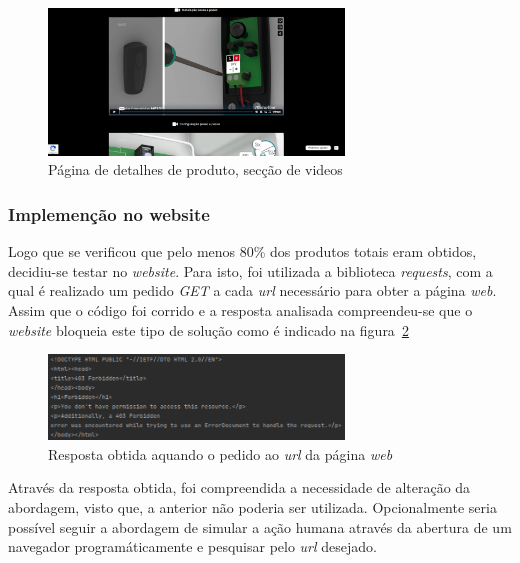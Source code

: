 \begin{figure}[htb]
    \centering
    
    \includegraphics[width=0.7\textwidth]{images/implementacao/scraper/pagina_detalhes_videos.png}
    \caption{Página de detalhes de produto, secção de videos}
    \label{fig:55}
\end{figure}

\newpage

\subsubsection{Implemenção no website}

Logo que se verificou que pelo menos 80\% dos produtos totais eram obtidos, decidiu-se testar no \textit{website}. Para isto, foi utilizada a biblioteca \textit{requests}, com a qual é realizado um pedido \textit{GET} a cada \textit{url} necessário para obter a página \textit{web}. Assim que o código foi corrido e a resposta analisada compreendeu-se que o \textit{website} bloqueia este tipo de solução como é indicado na figura~\ref{fig:56}

\begin{figure}[htb]
    \centering
    \includegraphics[width=0.7\textwidth]{images/implementacao/scraper/forbiden_response.png}
    \caption{Resposta obtida aquando o pedido ao \textit{url} da página \textit{web}}
    \label{fig:56}
\end{figure}

Através da resposta obtida, foi compreendida a necessidade de alteração da abordagem, visto que, a anterior não poderia ser utilizada. Opcionalmente seria possível seguir a abordagem de simular a ação humana através da abertura de um navegador programáticamente e pesquisar pelo \textit{url} desejado. 

